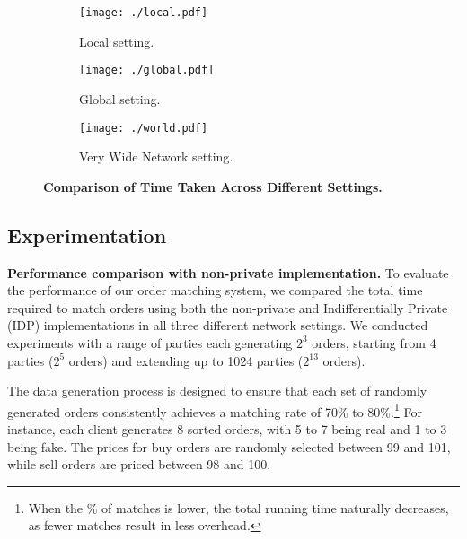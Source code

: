 \begin{figure*}[t]
    \centering
    \begin{subfigure}[t]{0.3\textwidth}  
        \centering
        \texttt{[image: ./local.pdf]}  %
        \caption{\textnormal{Local setting.}}
        \label{fig:local}
    \end{subfigure}
    \hspace{1em} %
    \begin{subfigure}[t]{0.3\textwidth}  
        \centering
        \texttt{[image: ./global.pdf]}  %
        \caption{\textnormal{Global setting.}}
        \label{fig:global}
    \end{subfigure}
    \hspace{1em} %
    \begin{subfigure}[t]{0.3\textwidth}  
        \centering
        \texttt{[image: ./world.pdf]}  %
        \caption{\textnormal{Very Wide Network setting.}}
        \label{fig:world}
    \end{subfigure}
    \caption{\textbf{Comparison of Time Taken Across Different Settings.}}
    \label{fig:comparison}
\end{figure*}


\subsection{Experimentation}

\noindent \textbf{Performance comparison with non-private implementation.}
To evaluate the performance of our order matching system, we compared the total time required to match orders using both the non-private and Indifferentially Private (IDP) implementations in all three different network settings. We conducted experiments with a range of parties each generating \(2^3\) orders, starting from 4 parties (\(2^5\) orders) and extending up to 1024 parties (\(2^{13}\) orders). 


The data generation process is designed to ensure that each set of randomly generated orders consistently achieves a matching rate of 70\% to 80\%.\footnote{When the \% of matches is lower, the total running time naturally decreases, as fewer matches result in less overhead.} For instance, each client generates 8 sorted orders, with 5 to 7 being real and 1 to 3 being fake. The prices for buy orders are randomly selected between 99 and 101, while sell orders are priced between 98 and 100.







